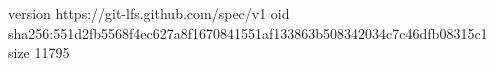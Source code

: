 version https://git-lfs.github.com/spec/v1
oid sha256:551d2fb5568f4ec627a8f1670841551af133863b508342034c7c46dfb08315c1
size 11795
